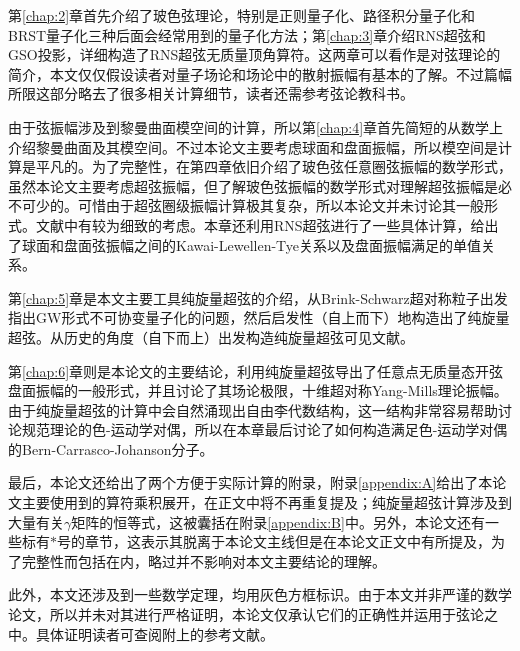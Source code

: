 第\ref{chap:2}章首先介绍了玻色弦理论，特别是正则量子化、路径积分量子化和BRST量子化三种后面会经常用到的量子化方法；第\ref{chap:3}章介绍RNS超弦和GSO投影，详细构造了RNS超弦无质量顶角算符。这两章可以看作是对弦理论的简介，本文仅仅假设读者对量子场论和场论中的散射振幅有基本的了解。不过篇幅所限这部分略去了很多相关计算细节，读者还需参考弦论教科书。\cite{Polchinski:1998rq,Polchinski:1998rr,Blumenhagen:2013fgp,Becker:2006dvp,Green:2012oqa,Green:2012pqa,Cecotti:2023dnp,Kiritsis:2019npv}

由于弦振幅涉及到黎曼曲面模空间的计算，所以第\ref{chap:4}章首先简短的从数学上介绍黎曼曲面及其模空间。不过本论文主要考虑球面和盘面振幅，所以模空间是计算是平凡的。为了完整性，在第四章依旧介绍了玻色弦任意圈弦振幅的数学形式，虽然本论文主要考虑超弦振幅，但了解玻色弦振幅的数学形式对理解超弦振幅是必不可少的。可惜由于超弦圈级振幅计算极其复杂，所以本论文并未讨论其一般形式。文献\cite{Witten:2012bh,DHoker:2002hof}中有较为细致的考虑。本章还利用RNS超弦进行了一些具体计算，给出了球面和盘面弦振幅之间的Kawai-Lewellen-Tye关系以及盘面振幅满足的单值关系。

第\ref{chap:5}章是本文主要工具纯旋量超弦的介绍，从Brink-Schwarz超对称粒子出发指出GW形式不可协变量子化的问题，然后启发性（自上而下）地构造出了纯旋量超弦。从历史的角度（自下而上）出发构造纯旋量超弦可见文献\cite{Berkovits:2002zk,Mafra:2008gkx}。

第\ref{chap:6}章则是本论文的主要结论，利用纯旋量超弦导出了任意点无质量态开弦盘面振幅的一般形式，并且讨论了其场论极限，十维超对称Yang-Mills理论振幅。由于纯旋量超弦的计算中会自然涌现出自由李代数结构，这一结构非常容易帮助讨论规范理论的色-运动学对偶，所以在本章最后讨论了如何构造满足色-运动学对偶的Bern-Carrasco-Johanson分子\cite{Mafra:2011kj}。

最后，本论文还给出了两个方便于实际计算的附录，附录\ref{appendix:A}给出了本论文主要使用到的算符乘积展开，在正文中将不再重复提及；纯旋量超弦计算涉及到大量有关$\gamma$矩阵的恒等式，这被囊括在附录\ref{appendix:B}中。另外，本论文还有一些标有$*$号的章节，这表示其脱离于本论文主线但是在本论文正文中有所提及，为了完整性而包括在内，略过并不影响对本文主要结论的理解。

此外，本文还涉及到一些数学定理，均用灰色方框标识。由于本文并非严谨的数学论文，所以并未对其进行严格证明，本论文仅承认它们的正确性并运用于弦论之中。具体证明读者可查阅附上的参考文献。